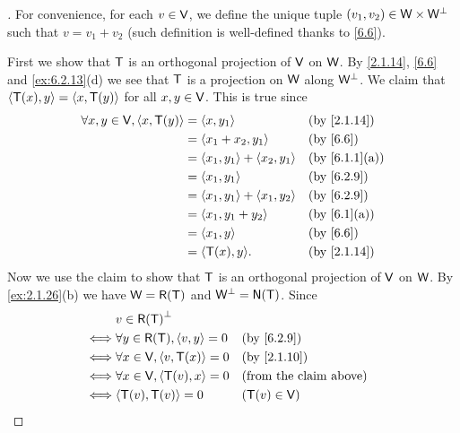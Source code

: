 \begin{proof}[]
  For convenience, for each \(v \in \mathsf{V}\), we define the unique tuple \((v_1, v_2) \in \mathsf{W} \times \mathsf{W}^{\perp}\) such that \(v = v_1 + v_2\) (such definition is well-defined thanks to \cref{6.6}).

  First we show that \(\mathsf{T}\) is an orthogonal projection of \(\mathsf{V}\) on \(\mathsf{W}\).
  By \cref{2.1.14}, \cref{6.6} and \cref{ex:6.2.13}(d) we see that \(\mathsf{T}\) is a projection on \(\mathsf{W}\) along \(\mathsf{W}^{\perp}\).
  We claim that \(\left\langle\mathsf{T}(x), y\right\rangle = \left\langle x, \mathsf{T}(y)\right\rangle\) for all \(x, y \in \mathsf{V}\).
  This is true since
  \begin{align*}
    \forall x, y \in \V, \inn{x, \T(y)} & = \inn{x, y_1}                    &  & \by{2.1.14}   \\
                                        & = \inn{x_1 + x_2, y_1}            &  & \by{6.6}      \\
                                        & = \inn{x_1, y_1} + \inn{x_2, y_1} &  & \by{6.1.1}[a] \\
                                        & = \inn{x_1, y_1}                  &  & \by{6.2.9}    \\
                                        & = \inn{x_1, y_1} + \inn{x_1, y_2} &  & \by{6.2.9}    \\
                                        & = \inn{x_1, y_1 + y_2}            &  & \by{6.1}[a]   \\
                                        & = \inn{x_1, y}                    &  & \by{6.6}      \\
                                        & = \inn{\T(x), y}.                 &  & \by{2.1.14}
  \end{align*}
  Now we use the claim to show that \(\mathsf{T}\) is an orthogonal projection of \(\mathsf{V}\) on \(\mathsf{W}\).
  By \cref{ex:2.1.26}(b) we have \(\W = \rg{\T}\) and \(\W^{\perp} = \ns{\T}\).
  Since
  \begin{align*}
         & v \in \rg{\T}^{\perp}                                                    \\
    \iff & \forall y \in \rg{\T}, \inn{v, y} = 0 &  & \by{6.2.9}                    \\
    \iff & \forall x \in \V, \inn{v, \T(x)} = 0  &  & \by{2.1.10}                   \\
    \iff & \forall x \in \V, \inn{\T(v), x} = 0  &  & \text{(from the claim above)} \\
    \iff & \inn{\T(v), \T(v)} = 0                &  & (\T(v) \in \V)                \\

\end{align*}
\end{proof}
